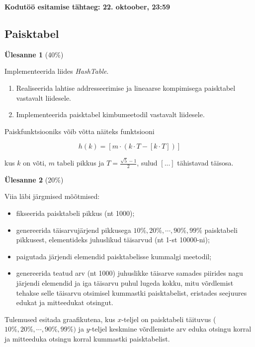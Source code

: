 \documentclass[a4paper]{article}
\begin{document}
\textbf{Kodutöö esitamise tähtaeg: 22. oktoober, 23:59}


{\center
\subsection*{Paisktabel}
}


\begin{problem}
\textbf{Ülesanne 1} (40\%)

Implementeerida liides \textit{HashTable}.
\begin{enumerate}
\item 
Realiseerida lahtise addresseerimise ja lineaarse kompimisega paisktabel vastavalt liidesele.

\item Implementeerida paisktabel kimbumeetodil vastavalt liidesele.
\end{enumerate}
\end{problem}

Paiskfunktsiooniks võib võtta näiteks funktsiooni 

\[h(k) = [m\cdot (k \cdot T  - [k \cdot T])]\]

kus $k$ on võti, $m$ tabeli pikkus ja $T = \frac{\sqrt{5} - 1}{2}$, sulud $[...]$ tähistavad täisosa.

\begin{problem}
\textbf{Ülesanne 2} (20\%)

Viia läbi järgmised mõõtmised:

\begin{itemize}
\item fikseerida paisktabeli pikkus (nt 1000);

\item genereerida täisarvujärjend pikkusega $10\%, 20\%, \cdots , 90\%, 99\%$ paisktabeli pikkusest, elementideks juhuslikud täisarvud (nt 1-st 10000-ni);

\item paigutada järjendi elemendid paisktabelisse kummalgi meetodil;

\item genereerida teatud arv (nt 1000) juhuslikke täisarve samades piirides nagu
järjendi elemendid ja iga täisarvu puhul lugeda kokku, mitu võrdlemist tehakse
selle täisarvu otsimisel kummastki paisktabelist, eristades seejuures
edukat ja mitteedukat otsingut.
\end{itemize}

Tulemused esitada graafikutena, kus $x$-teljel on paisktabeli täituvus ($10\%,
20\%, \cdots , 90\%, 99\%)$ ja $y$-teljel keskmine võrdlemiste arv eduka otsingu korral ja mitteeduka otsingu korral kummastki paisktabelist.
\end{problem}
\end{document}
